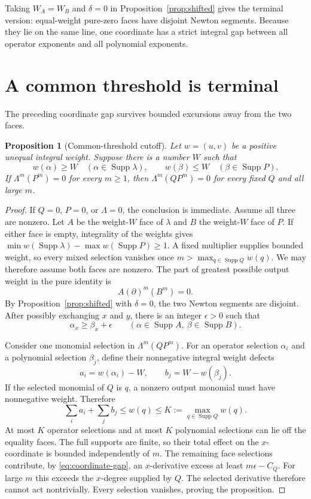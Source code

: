 \documentclass[11pt]{article}
\newtheorem{proposition}[theorem]{Proposition}
\newcommand{\Supp}{\operatorname{Supp}}
\begin{document}
Taking $W_A=W_B$ and $\delta=0$ in
Proposition~\ref{prop:shifted} gives the terminal version: equal-weight
pure-zero faces have disjoint Newton segments.  Because they lie on the
same line, one coordinate has a strict integral gap between all operator
exponents and all polynomial exponents.

\section{A common threshold is terminal}

The preceding coordinate gap survives bounded excursions away from the
two faces.

\begin{proposition}[Common-threshold cutoff]\label{prop:threshold}
Let $w=(u,v)$ be a positive unequal integral weight.  Suppose there is a
number $W$ such that
\begin{equation}\label{eq:threshold}
 w(\alpha)\geq W\quad(\alpha\in\Supp\lambda),
 \qquad
 w(\beta)\leq W\quad(\beta\in\Supp P).
\end{equation}
If $\Lambda^m(P^m)=0$ for every $m\geq1$, then
$\Lambda^m(QP^m)=0$ for every fixed $Q$ and all large $m$.
\end{proposition}

\begin{proof}
If $Q=0$, $P=0$, or $\Lambda=0$, the conclusion is immediate.  Assume
all three are nonzero.
Let $A$ be the weight-$W$ face of $\lambda$ and $B$ the weight-$W$ face
of $P$.  If either face is empty, integrality of the weights gives
$\min w(\Supp\lambda)-\max w(\Supp P)\geq1$.  A fixed multiplier
supplies bounded weight, so every mixed selection vanishes once
$m>\max_{q\in\Supp Q}w(q)$.
We may therefore assume both faces are nonzero.  The part of greatest
possible output weight in the pure identity
is
\[
 A(\partial)^m(B^m)=0.
\]
By Proposition~\ref{prop:shifted} with $\delta=0$, the two Newton segments
are disjoint.  After possibly exchanging $x$ and $y$, there is an integer
$\epsilon>0$ such that
\begin{equation}\label{eq:coordinate-gap}
 \alpha_x\geq\beta_x+\epsilon
 \qquad
 (\alpha\in\Supp A,\ \beta\in\Supp B).
\end{equation}

Consider one monomial selection in $\Lambda^m(QP^m)$.  For an operator
selection $\alpha_i$ and a polynomial selection $\beta_j$, define their
nonnegative integral weight defects
\[
 a_i=w(\alpha_i)-W,
 \qquad b_j=W-w(\beta_j).
\]
If the selected monomial of $Q$ is $q$, a nonzero output monomial must have
nonnegative weight.  Therefore
\[
 \sum_i a_i+\sum_j b_j\leq w(q)\leq
 K:=\max_{q\in\Supp Q}w(q).
\]
At most $K$ operator selections and at most $K$ polynomial selections can
lie off the equality faces.  The full supports are finite, so their total
effect on the $x$-coordinate is bounded independently of $m$.  The remaining
face selections contribute, by \eqref{eq:coordinate-gap}, an $x$-derivative
excess at least $m\epsilon-C_Q$.  For large $m$ this exceeds the
$x$-degree supplied by $Q$.  The selected derivative therefore cannot act
nontrivially.  Every selection vanishes, proving the proposition.
\end{proof}
\end{document}
